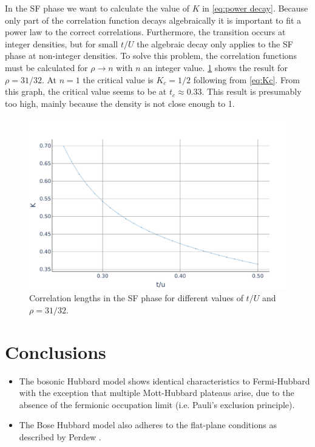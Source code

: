\documentclass[twoside,twocolumn,9pt]{article}
\begin{document}
In the SF phase we want to calculate the value of $K$ in \cref{eq:power decay}. Because only part of the correlation function decays algebraically it is important to fit a power law to the correct correlations. Furthermore, the transition occurs at integer densities, but for small $t/U$ the algebraic decay only applies to the SF phase at non-integer densities. To solve this problem, the correlation functions must be calculated for $\rho\rightarrow n$ with $n$ an integer value. \cref{fig:K values} shows the result for $\rho=31/32$. At $n=1$ the critical value is $K_c=1/2$ following from \cref{eq:Kc}. From this graph, the critical value seems to be at $t_c\approx 0.33$. This result is presumably too high, mainly because the density is not close enough to 1.
\begin{center}
  \begin{figure}
      \includegraphics[width=\linewidth]{../code/figures/Correlations-K-values.pdf}
      \caption{Correlation lengths in the SF phase for different values of $t/U$ and $\rho=31/32$.}
      \label{fig:K values}
  \end{figure}
\end{center}

\section{Conclusions}

\begin{itemize}
  \item The bosonic Hubbard model shows identical characteristics to Fermi-Hubbard with the exception that multiple Mott-Hubbard plateaus arise, due to the absence of the fermionic occupation limit (i.e. Pauli's exclusion principle).
  \item The Bose Hubbard model also adheres to the flat-plane conditions as described by Perdew \cite{perdew1982}.
\end{itemize}
\end{document}
